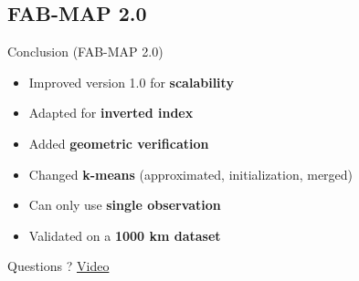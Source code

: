 \subsection{FAB-MAP 2.0}
\begin{frame}{Conclusion (FAB-MAP 2.0)}
    \begin{itemize}
        \item Improved version 1.0 for \textbf{scalability}
        \item Adapted for \textbf{inverted index}
        \item Added \textbf{geometric verification}
        \item Changed \textbf{k-means} (approximated, initialization, merged)
        \item Can only use \textbf{single observation}
        \item Validated on a \textbf{1000 km dataset}
    \end{itemize}
\end{frame}

\begin{frame}{Questions ?}
    \href{https://www.youtube.com/watch?v=GRTx5ovOSHo}{Video}
\end{frame}
